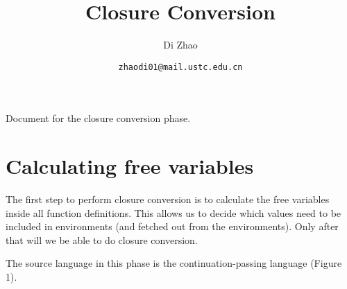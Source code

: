 \documentclass{article}
\theoremstyle{definition}
\theoremstyle{remark}
\numberwithin{equation}{section}
\begin{document}
\newcommand{\env}[1]{[\![#1]\!]\kappa}
\newcommand{\round}[1]{(\!|#1|\!)}

\title{Closure Conversion}%
\author{Di Zhao}%
\date{\small{\texttt{zhaodi01@mail.ustc.edu.cn}}}%

\maketitle

Document for the closure conversion phase.

\section{Calculating free variables}

The first step to perform closure conversion is to calculate the free variables
inside all function definitions. This allows us to decide which values need to be
 included in environments (and fetched out from the environments). Only
 after that will we be able to do closure conversion.

The source language in this phase is the continuation-passing language (Figure 1).
\end{document}
